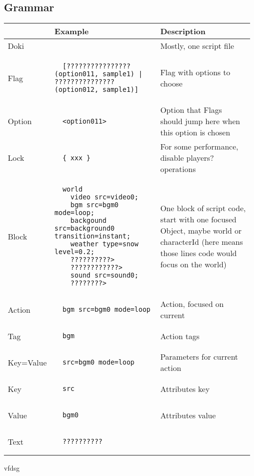 \subsection{Grammar}

\begin{center}
\begin{longtable}{| C{1cm} | L{8cm} | L{3cm} |}
  \hline
     & Example & Description \\ \hline
  Doki &
  &
  Mostly, one script file \\ \hline
  Flag & 
  \begin{lstlisting}
  [????????????????(option011, sample1) | ???????????????(option012, sample1)]
  \end{lstlisting} & 
  Flag with options to choose \\ \hline
  Option & 
  \begin{lstlisting}
  <option011>
  \end{lstlisting} &  
  Option that Flags should jump here when this option is chosen \\ \hline
  Lock &
  \begin{lstlisting}
  { xxx }
  \end{lstlisting} & 
  For some performance, disable players? operations \\ \hline
  Block &
  \begin{lstlisting}
  world
	video src=video0;
	bgm src=bgm0 mode=loop;
	backgound src=background0 transition=instant;
	weather type=snow level=0.2;
	??????????>
	????????????>
	sound src=sound0;
	????????>
  \end{lstlisting} & 
  One block of script code, start with one focused Object, maybe world or characterId (here means those lines code would focus on the world) \\ \hline
  Action &
  \begin{lstlisting}
  bgm src=bgm0 mode=loop
  \end{lstlisting} & 
  Action, focused on current \\ \hline
  Tag &
  \begin{lstlisting}
  bgm
  \end{lstlisting} & 
  Action tags \\ \hline
  Key=Value &
  \begin{lstlisting}
  src=bgm0 mode=loop
  \end{lstlisting} & 
  Parameters for current action \\ \hline
  Key &
  \begin{lstlisting}
  src	
  \end{lstlisting} & 
  Attributes key \\ \hline
  Value &
  \begin{lstlisting}
  bgm0
  \end{lstlisting} & 
  Attributes value\\ \hline
  Text &
  \begin{lstlisting}
  ??????????
  \end{lstlisting} & 
  \\ \hline
\end{longtable}
\end{center}

vfdsg
